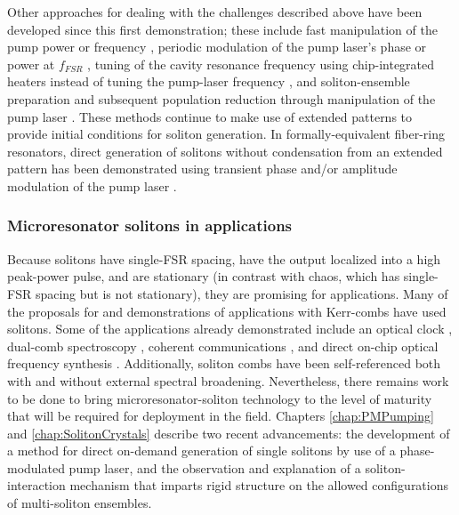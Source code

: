 Other approaches for dealing with the challenges described above have been developed since this first demonstration; these include fast manipulation of the pump power \cite{Brasch2016,Yi2015} or frequency \cite{Stone2017}, periodic modulation of the pump laser's phase or power at $f_{FSR}$ \cite{Lobanov2016,Obrzud2017}, tuning of the cavity resonance frequency using chip-integrated heaters instead of tuning the pump-laser frequency \cite{Joshi2016a,Wang2018a}, and soliton-ensemble preparation and subsequent population reduction through manipulation of the pump laser \cite{Guo2017a}. These methods continue to make use of extended patterns to provide initial conditions for soliton generation. In formally-equivalent fiber-ring resonators, direct generation of solitons without condensation from an extended pattern has been demonstrated using transient phase and/or amplitude modulation of the pump laser \cite{Jang2015,Jang2015a,Wang2018}. 


\subsubsection{Microresonator solitons in applications}

Because solitons have single-FSR spacing, have the output localized into a high peak-power pulse, and are stationary (in contrast with chaos, which has single-FSR spacing but is not stationary), they are promising for applications. Many of the proposals for and demonstrations of applications with Kerr-combs have used solitons. Some of the applications already demonstrated include an optical clock \cite{Papp2014}, dual-comb spectroscopy \cite{Suh2016a}, coherent communications \cite{Marin-Palomo2017}, and direct on-chip optical frequency synthesis \cite{Spencer2018}. Additionally, soliton combs have been self-referenced both with \cite{Jost2015,DelHaye2016} and without \cite{Brasch2017,Briles2017} external spectral broadening. Nevertheless, there remains work to be done to bring microresonator-soliton technology to the level of maturity that will be required for deployment in the field. Chapters \ref{chap:PMPumping} and \ref{chap:SolitonCrystals} describe two recent advancements: the development of a method for direct on-demand generation of single solitons by use of a phase-modulated pump laser, and the observation and explanation of a soliton-interaction mechanism that imparts rigid structure on the allowed configurations of multi-soliton ensembles.



